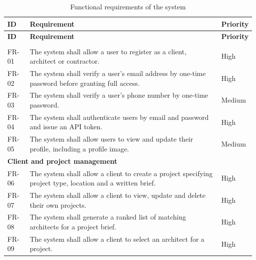 %
{\small
\begin{longtable}{|l|p{9.2cm}|l|}
  \caption{Functional requirements of the system}
  \label{tab:functional-requirements} \\
  \hline
  \textbf{ID} & \textbf{Requirement} & \textbf{Priority} \\
  \hline
  \endfirsthead
  \hline
  \textbf{ID} & \textbf{Requirement} & \textbf{Priority} \\
  \hline
  \endhead
  \hline
  \endfoot

  \multicolumn{3}{|l|}{\textbf{Authentication and account management}} \\
  \hline
  FR-01 & The system shall allow a user to register as a client,
          architect or contractor. & High \\
  \hline
  FR-02 & The system shall verify a user's email address by one-time
          password before granting full access. & High \\
  \hline
  FR-03 & The system shall verify a user's phone number by one-time
          password. & Medium \\
  \hline
  FR-04 & The system shall authenticate users by email and password and
          issue an API token. & High \\
  \hline
  FR-05 & The system shall allow users to view and update their profile,
          including a profile image. & Medium \\
  \hline

  \multicolumn{3}{|l|}{\textbf{Client and project management}} \\
  \hline
  FR-06 & The system shall allow a client to create a project specifying
          project type, location and a written brief. & High \\
  \hline
  FR-07 & The system shall allow a client to view, update and delete
          their own projects. & High \\
  \hline
  FR-08 & The system shall generate a ranked list of matching architects
          for a project brief. & High \\
  \hline
  FR-09 & The system shall allow a client to select an architect for a
          project. & High \\
  \hline


\end{longtable}}
